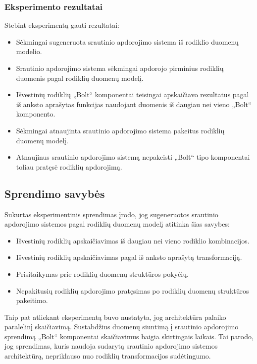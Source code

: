\documentclass{VUMIFPSbakalaurinis}
\begin{document}
\subsubsection{Eksperimento rezultatai}
Stebint eksperimentą gauti rezultatai:
\begin{itemize}
    \item Sėkmingai sugeneruota srautinio apdorojimo sistema iš rodiklio duomenų modelio.
    \item Srautinio apdorojimo sistema sėkmingai apdorojo pirminius rodiklių duomenis pagal rodiklių duomenų modelį.
    \item Išvestinių rodiklių „Bolt“ komponentai teisingai apskaičiavo rezultatus pagal iš anksto aprašytas funkcijas naudojant duomenis iš daugiau nei vieno „Bolt“ komponento.
    \item Sėkmingai atnaujinta srautinio apdorojimo sistema pakeitus rodiklių duomenų modelį.
    \item Atnaujinus srautinio apdorojimo sistemą nepakeisti „Bolt“ tipo komponentai toliau pratęsė rodiklių apdorojimą. 
\end{itemize}
\subsection{Sprendimo savybės}

Sukurtas eksperimentinis sprendimas įrodo, jog sugeneruotos srautinio apdorojimo sistemos pagal rodiklių duomenų modelį atitinka šias savybes:
\begin{itemize}
    \item Išvestinių rodiklių apskaičiavimas iš daugiau nei vieno rodiklio kombinacijos.
    \item Išvestinių rodiklių apskaičiavimas pagal iš anksto aprašytą transformaciją.
    \item Prisitaikymas prie rodiklių duomenų struktūros pokyčių. 
    \item Nepakitusių rodiklių apdorojimo pratęsimas po rodiklių duomenų struktūros pakeitimo.
\end{itemize} 
Taip pat atliekant eksperimentą buvo nustatyta, jog architektūra palaiko paralelinį skaičiavimą. Sustabdžius duomenų siuntimą į srautinio apdorojimo sprendimą „Bolt“ komponentai skaičiavimus baigia skirtingais laikais. Tai parodo, jog sprendimas, kuris naudoja sudarytą srautinio apdorojimo sistemos architektūrą, nepriklauso nuo rodiklių transformacijos sudėtingumo.
\end{document}
